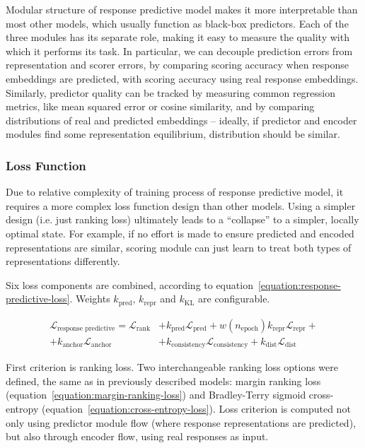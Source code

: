 \documentclass[a4paper,11pt,twoside]{report}
\theoremstyle{definition}
\begin{document}
Modular structure of response predictive model makes it more interpretable than most other models, which usually function as black-box predictors. Each of the three modules has its separate role, making it easy to measure the quality with which it performs its task. In particular, we can decouple prediction errors from representation and scorer errors, by comparing scoring accuracy when response embeddings are predicted, with scoring accuracy using real response embeddings. Similarly, predictor quality can be tracked by measuring common regression metrics, like mean squared error or cosine similarity, and by comparing distributions of real and predicted embeddings -- ideally, if predictor and encoder modules find some representation equilibrium, distribution should be similar.

\subsubsection{Loss Function}

Due to relative complexity of training process of response predictive model, it requires a more complex loss function design than other models. Using a simpler design (i.e. just ranking loss) ultimately leads to a ``collapse'' to a simpler, locally optimal state. For example, if no effort is made to ensure predicted and encoded representations are similar, scoring module can just learn to treat both types of representations differently. 

Six loss components are combined, according to equation~\ref{equation:response-predictive-loss}. Weights $k_\text{pred}$, $k_\text{repr}$ and $k_\text{KL}$ are configurable.

\begin{align}
\label{equation:response-predictive-loss}
    \mathcal{L}_\text{response predictive} = \mathcal{L}_\text{rank} & + k_\text{pred} \mathcal{L}_\text{pred} + w(n_\text{epoch}) k_\text{repr} \mathcal{L}_\text{repr} + \\
    + k_\text{anchor} \mathcal{L}_\text{anchor} & + k_\text{consistency} \mathcal{L}_\text{consistency} + k_\text{dist} \mathcal{L}_\text{dist}
\end{align}

First criterion is ranking loss. Two interchangeable ranking loss options were defined, the same as in previously described models: margin ranking loss (equation~\ref{equation:margin-ranking-loss}) and Bradley-Terry sigmoid cross-entropy (equation~\ref{equation:cross-entropy-loss}). Loss criterion is computed not only using predictor module flow (where response representations are predicted), but also through encoder flow, using real responses as input.
\end{document}
